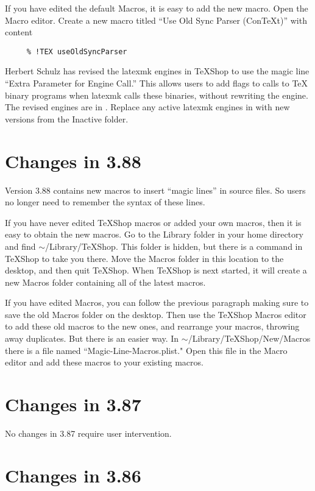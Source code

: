 \documentclass[11pt, oneside]{amsart}
\begin{document}
If you have edited the default Macros, it is easy to add the new macro. Open the Macro editor. Create a new macro titled ``Use Old Sync Parser (ConTeXt)'' with content
\begin{verbatim}
     % !TEX useOldSyncParser
\end{verbatim}

Herbert Schulz has revised the latexmk engines in TeXShop to use the magic line ``Extra Parameter for Engine Call.'' This allows users to add  flags to calls to TeX binary programs when latexmk calls these binaries, without rewriting the engine. The revised engines are in . Replace any active latexmk engines in
 with new versions from the Inactive folder.

\section{Changes in 3.88}

Version 3.88 contains new macros to insert ``magic lines'' in source files. So users no longer need to remember the syntax of these lines.

If you have never edited TeXShop macros or added your own macros, then it is easy to obtain the new macros.
Go to the Library folder in your home directory and find $\sim$/Library/TeXShop. This folder is hidden, but there is a command in TeXShop to take you there. Move the Macros folder in this location to the desktop,
and then quit TeXShop. When TeXShop is next started, it will create a new Macros folder containing all of the latest macros.

If you have edited Macros, you can follow the previous paragraph making sure to save the old Macros folder on the desktop. Then use the TeXShop Macros editor to add these old macros to the new ones, and rearrange your macros, throwing away duplicates. But there is an easier way. In $\sim$/Library/TeXShop/New/Macros there is a file named ``Magic-Line-Macros.plist." Open this file in the Macro editor and add these macros to your existing macros.


\section{Changes in 3.87}

No changes in 3.87 require user intervention.

\section{Changes in 3.86}
\end{document}
